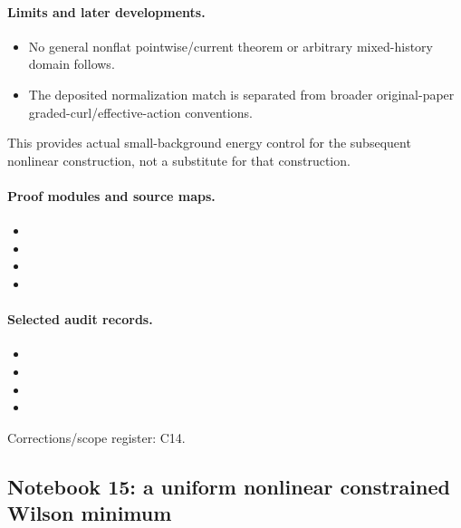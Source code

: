 \paragraph{Limits and later developments.}
\begin{itemize}
\item No general nonflat pointwise/current theorem or arbitrary mixed-history domain follows.
\item The deposited normalization match is separated from broader original-paper graded-curl/effective-action conventions.
\end{itemize}

This provides actual small-background energy control for the subsequent nonlinear construction, not a substitute for that construction.

\paragraph{Proof modules and source maps.}
\begingroup\small
\begin{itemize}
\item {}
\item {}
\item {}
\item {}
\end{itemize}
\endgroup

\paragraph{Selected audit records.}
\begingroup\small
\begin{itemize}
\item {}
\item {}
\item {}
\item {}
\end{itemize}
\endgroup
Corrections/scope register: C14.\par

\subsection{Notebook 15: a uniform nonlinear constrained Wilson minimum}
\label{hnc-15}
\noindent{}\par

